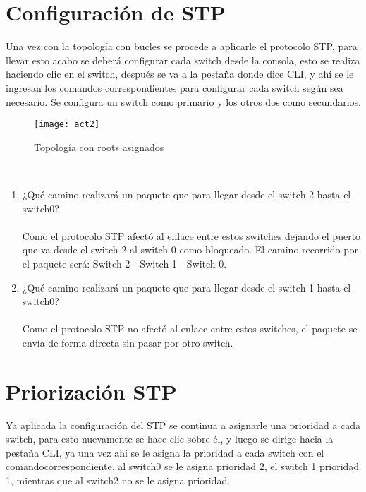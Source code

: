 \documentclass{udpreport}
\begin{document}
	\section{Configuración de STP}
	Una vez con la topología con bucles se procede a aplicarle el protocolo STP, para llevar esto acabo se deberá configurar cada
	switch desde la consola, esto se realiza haciendo clic en el switch, después se va a la pestaña donde dice CLI, y ahí se le
	ingresan los comandos correspondientes para configurar cada switch según sea necesario. Se configura un switch como
	primario y los otros dos como secundarios.\\
	\begin{figure}[H]
	\centering
	\texttt{[image: act2]}
	\caption{Topología con roots asignados}
	\end{figure}\\
    \begin{enumerate}
	    \item ¿Qué camino realizará un paquete que para llegar desde el switch
2 hasta el switch0?\\\\
        Como el protocolo STP afectó al enlace entre estos switches dejando el puerto que va desde el switch 2 al switch 0 como bloqueado. El camino recorrido por el paquete será: Switch 2 - Switch 1 - Switch 0. 
        \item  ¿Qué camino realizará un paquete que para llegar desde el switch
1 hasta el switch0?\\\\
          Como el protocolo STP no afectó al enlace entre estos switches, el paquete se envía de forma directa sin pasar por otro switch.
	\end{enumerate}
	\section{Priorización STP}
	   
	    Ya aplicada la configuración del STP se continua a asignarle una prioridad a cada switch,  para esto nuevamente se hace clic	sobre él, y luego se dirige hacia la pestaña CLI, ya una vez ahí se le asigna la prioridad a cada switch con el comandocorrespondiente, al switch0 se le asigna prioridad 2, el switch 1 prioridad 1, mientras que al switch2 no se le asigna prioridad.\\
	
\end{document}

